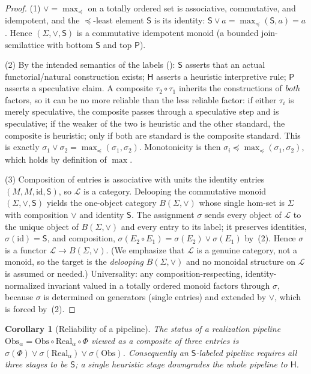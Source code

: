 \documentclass[12pt]{article}
\newtheorem{corollary}[theorem]{Corollary}
\theoremstyle{definition}
\theoremstyle{remark}
\newcommand{\Real}{\mathrm{Real}}
\newcommand{\Obs}{\mathrm{Obs}}
\newcommand{\id}{\mathrm{id}}
\newcommand{\Sstat}{\mathsf{S}}
\newcommand{\Hstat}{\mathsf{H}}
\newcommand{\Pstat}{\mathsf{P}}
\newcommand{\stO}{\preceq}
\begin{document}
\begin{proof}
(1) $\vee = \max_{\stO}$ on a totally ordered set is associative, commutative,
and idempotent, and the $\stO$-least element $\Sstat$ is its identity:
$\Sstat \vee a = \max_{\stO}(\Sstat, a) = a$. Hence $(\Sigma,\vee,\Sstat)$ is
a commutative idempotent monoid (a bounded join-semilattice with bottom $\Sstat$
and top $\Pstat$).

(2) By the intended semantics of the labels (): $\Sstat$
asserts that an actual functorial/natural construction exists; $\Hstat$ asserts a
heuristic interpretive rule; $\Pstat$ asserts a speculative claim. A composite
$\tau_2\circ\tau_1$ inherits the constructions of \emph{both} factors, so it can
be no more reliable than the less reliable factor: if either $\tau_i$ is merely
speculative, the composite passes through a speculative step and is speculative;
if the weaker of the two is heuristic and the other standard, the composite is
heuristic; only if both are standard is the composite standard. This is exactly
$\sigma_1 \vee \sigma_2 = \max_{\stO}(\sigma_1,\sigma_2)$. Monotonicity is then
$\sigma_i \stO \max_{\stO}(\sigma_1,\sigma_2)$, which holds by definition of
$\max$.

(3) Composition of entries is associative with units the identity entries
$(M,M,\id,\Sstat)$, so $\mathcal{L}$ is a category. Delooping the commutative
monoid $(\Sigma,\vee,\Sstat)$ yields the one-object category $B(\Sigma,\vee)$
whose single hom-set is $\Sigma$ with composition $\vee$ and identity
$\Sstat$. The assignment $\sigma$ sends every object of $\mathcal{L}$ to the
unique object of $B(\Sigma,\vee)$ and every entry to its label; it preserves
identities, $\sigma(\id) = \Sstat$, and composition,
$\sigma(E_2\circ E_1) = \sigma(E_2)\vee\sigma(E_1)$ by~(2). Hence $\sigma$ is a
functor $\mathcal{L} \to B(\Sigma,\vee)$. (We emphasize that $\mathcal{L}$ is a
genuine category, not a monoid, so the target is the \emph{delooping}
$B(\Sigma,\vee)$ and no monoidal structure on $\mathcal{L}$ is assumed or
needed.) Universality: any composition-respecting, identity-normalized invariant
valued in a totally ordered monoid factors through $\sigma$, because $\sigma$ is
determined on generators (single entries) and extended by $\vee$, which is
forced by~(2).
\end{proof}

\begin{corollary}[Reliability of a pipeline]
\label{cor:pipeline-status}
The status of a realization pipeline $\Obs_\alpha = \Obs\circ\Real_\alpha\circ\Phi$
viewed as a composite of three entries is
$\sigma(\Phi)\vee\sigma(\Real_\alpha)\vee\sigma(\Obs)$. Consequently an
$\Sstat$-labeled pipeline requires \emph{all three} stages to be $\Sstat$; a
single heuristic stage downgrades the whole pipeline to $\Hstat$.
\end{corollary}
\end{document}
